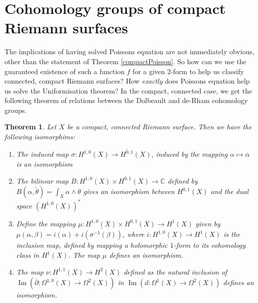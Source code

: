 \documentclass[11pt]{report}
\newtheorem{thm}{Theorem}[section]
\theoremstyle{definition}
\DeclareMathOperator{\im}{Im}
\begin{document}
\section{Cohomology groups of compact Riemann surfaces}\label{noRiemannRoch}
The implications of having solved Poissons equation are not immediately obvious, other than the statement of Theorem \ref{compactPoisson}. So how can we use the guaranteed existence of such a function $f$ for a given $2$-form to help us classify connected, compact Riemann surfaces? How \emph{exactly} does Poissons equation help us solve the Uniformisation theorem? In the compact, connected case, we get the following theorem of relations between the Dolbeault and de-Rham cohomology groups.

\begin{thm}
  Let $X$ be a compact, connected Riemann surface. Then we have the following isomorphims:
  \begin{enumerate}
    \item The induced map $\sigma: H^{1,0}(X) \rightarrow \overline{H^{0,1}}(X)$, induced by the mapping $\alpha \mapsto \overline{\alpha}$ is an isomorphism
    \item The bilinear map $B:H^{1,0}(X)\times H^{0,1}(X) \rightarrow \mathbb{C}$ defined by $B(\alpha, \tilde{\theta})=\int_X \alpha \wedge \theta$ gives an isomorphism between $H^{0,1}(X)$ and the dual space $(H^{1,0}(X))^*$
    \item Define the mapping $\mu:H^{1,0}(X) \times H^{0,1}(X) \rightarrow H^1(X)$ given by $\mu(\alpha, \beta) = i(\alpha) + \overline{i(\sigma^{-1}(\beta))}$, where $i:H^{1,0}(X) \rightarrow H^1(X)$ is the inclusion map, defined by mapping a holomorphic $1$-form to its cohomology class in $H^1(X)$. The map $\mu$ defines an isomorphism.
    \item The map $\nu:H^{1,1}(X) \rightarrow H^2(X)$ defined as the natural inclusion of $\im(\overline{\partial}:\Omega^{1,0}(X)\rightarrow \Omega^2(X))$ in $\im(d:\Omega^1(X)\rightarrow \Omega^2(X))$ defines an isomorphism.
  \end{enumerate}
\end{thm}
\end{document}
